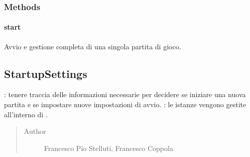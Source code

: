 \documentclass[letterpaper,10pt,italian,openany,oneside]{sphinxmanual}
\begin{document}
\subsubsection{Methods}
\label{\detokenize{source/it/unicam/cs/pa/mastermind/gamecore/SingleMatch:methods}}

\paragraph{start}
\label{\detokenize{source/it/unicam/cs/pa/mastermind/gamecore/SingleMatch:start}}

\begin{fulllineitems}
\label{\detokenize{source/it/unicam/cs/pa/mastermind/gamecore/SingleMatch:it.unicam.cs.pa.mastermind.gamecore.SingleMatch.start()}}
Avvio e gestione completa di una singola partita di gioco.

\end{fulllineitems}



\subsection{StartupSettings}
\label{\detokenize{source/it/unicam/cs/pa/mastermind/gamecore/StartupSettings:startupsettings}}\label{\detokenize{source/it/unicam/cs/pa/mastermind/gamecore/StartupSettings::doc}}

\begin{fulllineitems}
\label{\detokenize{source/it/unicam/cs/pa/mastermind/gamecore/StartupSettings:it.unicam.cs.pa.mastermind.gamecore.StartupSettings}}
: tenere traccia delle informazioni necessarie per decidere se iniziare una nuova partita e se impostare nuove impostazioni di avvio. : le istanze vengono gestite all’interno di .
\begin{quote}\begin{description}
\item[{Author}] \leavevmode
Francesco Pio Stelluti, Francesco Coppola

\end{description}\end{quote}

\end{fulllineitems}
\end{document}
